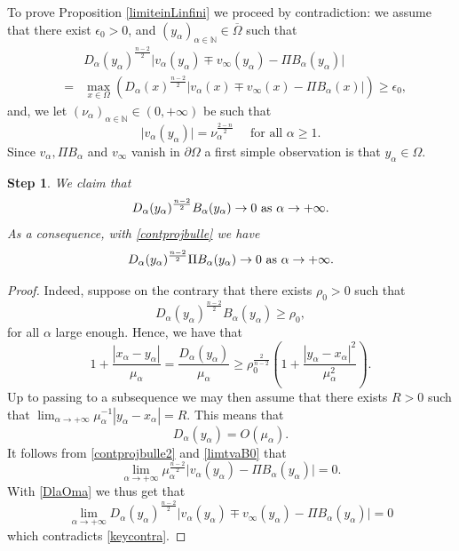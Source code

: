\documentclass[10pt]{amsart}
\numberwithin{equation}{section}
\newcommand{\Om}{\Omega}
\newcommand{\ma}{\mu_\alpha}
\def \ep{\epsilon}
\def \bb{\hbox}
\def \xl{x_\alpha}
\def \ls{+\infty}
\def\la{\alpha}
\def \ma{\mu_{\alpha}}
\def \yl{y_{\alpha}}
\def \vo {v_{\infty}}
\def \nn{\mathbb{N}}
\newtheorem{step}{Step}
\theoremstyle{plain}
\theoremstyle{remark}
\begin{document}
To prove Proposition \ref{limiteinLinfini} we proceed by contradiction: we assume that there exist $\ep_0>0$, and $(y_\la)_{\la\in \nn} \in \overline{\Om}$ such that 
\begin{eqnarray}\label{keycontra}
&&D_{\la}(\yl)^{\frac{n-2}{2}}\Big| v_{\la}(\yl)\mp\vo(\yl)-\Pi B_{\la}(\yl)\Big| \nonumber\\
&=&\max_{x\in\Om} \left(D_{\la}(x)^{\frac{n-2}{2}}\Big|v_{\la}(x)\mp\vo(x)-\Pi B_{\la}(x)\Big| \right) \geq \ep _0,
\end{eqnarray}
and, we let $(\nu_{\la})_{\alpha \in \nn}\in(0,+\infty)$ be such that 
\begin{equation}\label{defnula}
\big|v_{\la}(\yl)\big|=\nu_\la^{\frac{2-n}{2}} \quad \text{ for all } \alpha \ge 1.
\end{equation}
Since $v_\alpha, \Pi B_\alpha $ and $v_\infty$ vanish in $\partial \Om$ a first simple observation is that $y_\alpha \in \Om$.

\begin{step}\label{limDlaBla}
	We claim that 
		\begin{equation*}
		D_{\la}(\yl)^{\frac{n-2}{2}}B_{\la}(\yl)\to 0 \bb{ as } \la \to \ls.
	\end{equation*}
As a consequence, with \eqref{contprojbulle} we have 
	\begin{equation}\label{eq:limDlaBla}
		D_{\la}(\yl)^{\frac{n-2}{2}}\Pi B_{\la}(\yl)\to 0 \bb{ as } \la \to \ls.
	\end{equation}
\end{step}

\begin{proof}
Indeed, suppose on the contrary that there exists $\rho_0>0$ such that 
\begin{equation*}
D_\la(\yl)^{\frac{n-2}{2}}B_\la(\yl)\geq \rho_0,
\end{equation*}
for all $\alpha$ large enough. Hence, we have that
\begin{equation*}
1 + \frac{|\xl - \yl|}{\ma} = \frac{D_\la(\yl)}{\ma}\geq \rho_0^{\frac{2}{n-2}}\left(  1+ \frac{|\yl-\xl|^2}{\ma^2}\right).
\end{equation*}
Up to passing to a subsequence we may then assume that there exists $R>0$ such that $\lim_{\la\to \ls}\ma^{-1}|\yl-\xl|=R$. This means that 
\begin{equation}\label{DlaOma}
	D_{\la}(\yl)=O(\ma).
\end{equation}
It follows from \eqref{contprojbulle2} and \eqref{limtvaB0} that 
\begin{equation*} 
\lim_{\la\to\ls} \ma^{\frac{n-2}{2}}\Big|v_\la(\yl)-\Pi B_\la(\yl)\Big|=0.
\end{equation*}
With \eqref{DlaOma}  we thus get that 
\begin{equation*}
\lim_{\la\to\ls} D_\la(\yl)^{\frac{n-2}{2}}\Big|v_{\la}(\yl)\mp\vo(\yl)-\Pi B_{\la}(\yl)\Big|=0
\end{equation*}
which contradicts \eqref{keycontra}. 
\end{proof}
\end{document}
